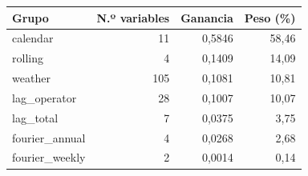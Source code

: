 \begin{tabular}{lrrr}
\toprule
\rowcolor{naranja}
\textbf{Grupo} & \textbf{N.º variables} & \textbf{Ganancia} & \textbf{Peso (\%)} \\
\midrule
\rowcolor{filaclara} calendar & 11 & 0,5846 & 58,46 \\
rolling & 4 & 0,1409 & 14,09 \\
\rowcolor{filaclara} weather & 105 & 0,1081 & 10,81 \\
lag\_\allowbreak{}operator & 28 & 0,1007 & 10,07 \\
\rowcolor{filaclara} lag\_\allowbreak{}total & 7 & 0,0375 & 3,75 \\
fourier\_\allowbreak{}annual & 4 & 0,0268 & 2,68 \\
\rowcolor{filaclara} fourier\_\allowbreak{}weekly & 2 & 0,0014 & 0,14 \\
\bottomrule
\end{tabular}
